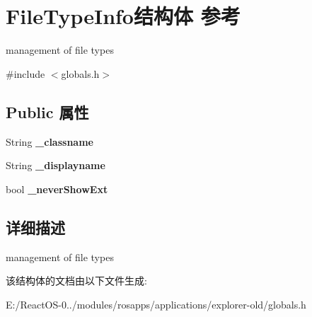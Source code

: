 \hypertarget{struct_file_type_info}{}\section{File\+Type\+Info结构体 参考}
\label{struct_file_type_info}


management of file types  




{\ttfamily \#include $<$globals.\+h$>$}

\subsection*{Public 属性}
\begin{DoxyCompactItemize}
\item 
\mbox{\label{struct_file_type_info_a3689fcac16412b181a9b743b9b4de879}} 
String {\bfseries \+\_\+classname}
\item 
\mbox{\label{struct_file_type_info_ae00b016d1df3b4cbc09e6c6de976224d}} 
String {\bfseries \+\_\+displayname}
\item 
\mbox{\label{struct_file_type_info_ac74c837961d7e758250dc02cb3a16fa4}} 
bool {\bfseries \+\_\+never\+Show\+Ext}
\end{DoxyCompactItemize}


\subsection{详细描述}
management of file types 

该结构体的文档由以下文件生成\+:\begin{DoxyCompactItemize}
\item 
E\+:/\+React\+O\+S-\/0../modules/rosapps/applications/explorer-\/old/globals.\+h\end{DoxyCompactItemize}

